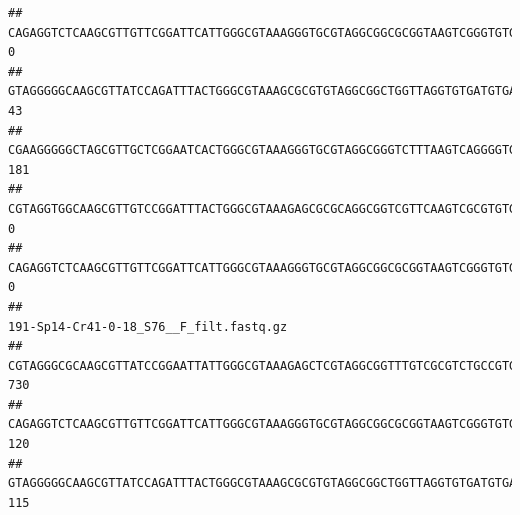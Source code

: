\documentclass[]{article}
\begin{document}
\begin{verbatim}
## CAGAGGTCTCAAGCGTTGTTCGGATTCATTGGGCGTAAAGGGTGCGTAGGCGGCGCGGTAAGTCGGGTGTGAAATCTCGGAGCTTAACTCCGAAACTGCATTCGATACTGCCGTGCTTGAGGACTGGAGAGGAGACTGGAATTTACGGTGTAGCGGTGAAATGCGTAGATATCGTAAGGAAGACCAGTGGCGAAGGCGGGTCTCTGGACAGTTCCTGACGCTGAGGCACGAAGGCCAGGGGAGCAAACG                                       0
## GTAGGGGGCAAGCGTTATCCAGATTTACTGGGCGTAAAGCGCGTGTAGGCGGCTGGTTAGGTGTGATGTGAAATCTTCCGGCTCAACCGGAAAACTGCATTGCAAACCGGCCTGGCTAGAGTGCAGGAGAGGGAAGCGGAATTCCAGGTGTAGCGGTGAAATGCGTAGATATCTGGAGGAACACCAGTGGCGAAGGCGGCTTCCTGGCCTGCAACTGACGCTGAGACGCGAAAGCGTGGGGAGCGAAC                                       43
## CGAAGGGGGCTAGCGTTGCTCGGAATCACTGGGCGTAAAGGGTGCGTAGGCGGGTCTTTAAGTCAGGGGTGAAATCCTGGAGCTCAACTCCAGAACTGCCTTTGATACTGAAGATCTTGAGTTCGGGAGAGGTGAGTGGAACTGCGAGTGTAGAGGTGAAATTCGTAGATATTCGCAAGAACACCAGTGGCGAAGGCGGCTCACTGGCCCGATACTGACGCTGAGGCACGAAAGCGTGGGGAGCAAACA                                     181
## CGTAGGTGGCAAGCGTTGTCCGGATTTACTGGGCGTAAAGAGCGCGCAGGCGGTCGTTCAAGTCGCGTGTGAAAGCCCCCGGCTCAACTGGGGAGGGTCACGCGATACTGATCGACTCGAAGGCAGGAGAGGGTAGTGGAATTCCCGGTGTAGTGGTGAAATGCGTAGATATCGGGAGGAACACCAGTGGCGAAGGCGACTACCTGGCCTGTTCTTGACGCTGAGGCGCGAAAGCTAGGGGAGCAAACG                                       0
## CAGAGGTCTCAAGCGTTGTTCGGATTCATTGGGCGTAAAGGGTGCGTAGGCGGCGCGGTAAGTCGGGTGTGAAATCTCGGGGCTTAACTCCGAAACTGCATTCGATACTGCCGTGCTTGAGGACTGGAGAGGAGACTGGAATTTACGGTGTAGCGGTGAAATGCGTAGATATCGTAAGGAAGACCAGTGGCGAAGGCGGGTCTCTGGACAGTTCCTGACGCTGAGGCACGAAGGCCAGGGGAGCAAACG                                       0
##                                                                                                                                                                                                                                                           191-Sp14-Cr41-0-18_S76__F_filt.fastq.gz
## CGTAGGGCGCAAGCGTTATCCGGAATTATTGGGCGTAAAGAGCTCGTAGGCGGTTTGTCGCGTCTGCCGTGAAAGTCCGGGGCTCAACTCCGGATCTGCGGTGGGTACGGGCAGACTAGAGTGATGTAGGGGAGACTGGAATTCCTGGTGTAGCGGTGAAATGCGCAGATATCAGGAGGAACACCGATGGCGAAGGCAGGTCTCTGGGCATTAACTGACGCTGAGGAGCGAAAGCATGGGGAGCGAACA                                     730
## CAGAGGTCTCAAGCGTTGTTCGGATTCATTGGGCGTAAAGGGTGCGTAGGCGGCGCGGTAAGTCGGGTGTGAAATCTCGGAGCTTAACTCCGAAACTGCATTCGATACTGCCGTGCTTGAGGACTGGAGAGGAGACTGGAATTTACGGTGTAGCGGTGAAATGCGTAGATATCGTAAGGAAGACCAGTGGCGAAGGCGGGTCTCTGGACAGTTCCTGACGCTGAGGCACGAAGGCCAGGGGAGCAAACG                                     120
## GTAGGGGGCAAGCGTTATCCAGATTTACTGGGCGTAAAGCGCGTGTAGGCGGCTGGTTAGGTGTGATGTGAAATCTTCCGGCTCAACCGGAAAACTGCATTGCAAACCGGCCTGGCTAGAGTGCAGGAGAGGGAAGCGGAATTCCAGGTGTAGCGGTGAAATGCGTAGATATCTGGAGGAACACCAGTGGCGAAGGCGGCTTCCTGGCCTGCAACTGACGCTGAGACGCGAAAGCGTGGGGAGCGAAC                                      115

\end{verbatim}
\end{document}
